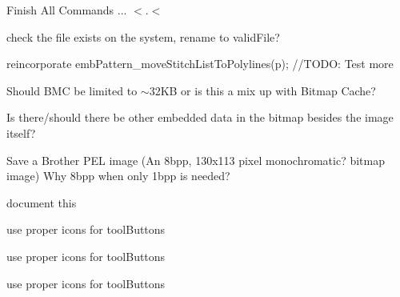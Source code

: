 \begin{DoxyRefList}
Finish All Commands ... \texorpdfstring{$<$}{<}.\texorpdfstring{$<$}{<} 
\item[Member \mbox{\hyperlink{class_main_window_af95b9b8dba27d822373f4424074bfde7}{Main\+Window\+::valid\+File\+Format}} (const QString \&file\+Name)]\label{todo__todo000004}%
%
check the file exists on the system, rename to valid\+File?  
\item[Member \mbox{\hyperlink{class_mdi_window_a8437f8fd71bcf6da5de2a49cbd0b105b}{Mdi\+Window\+::load\+File}} (const QString \&file\+Name)]\label{todo__todo000005}%
%
reincorporate emb\+Pattern\+\_\+move\+Stitch\+List\+To\+Polylines(p); //\+TODO\+: Test more  
\item[Member \mbox{\hyperlink{class_mdi_window_a2167cf71975c040208ae05b7b6b10a2f}{Mdi\+Window\+::save\+BMC}} ()]\label{todo__todo000007}%
%
Should BMC be limited to $\sim$32\+KB or is this a mix up with Bitmap Cache? 



Is there/should there be other embedded data in the bitmap besides the image itself? 

\label{todo__todo000006}%
%
Save a Brother PEL image (An 8bpp, 130x113 pixel monochromatic? bitmap image) Why 8bpp when only 1bpp is needed? 
\item[Member \mbox{\hyperlink{class_property_editor_af77a9b50a881ba48136c67f40c274e1e}{Property\+Editor\+::create\+Combo\+Box\+Selected}} ()]\label{todo__todo000018}%
%
document this  
\item[Member \mbox{\hyperlink{class_property_editor_a6e903f301e6b9cddd3e33f622c58d096}{Property\+Editor\+::create\+Group\+Box\+General}} ()]\label{todo__todo000020}%
%
use proper icons for tool\+Buttons  
\item[Member \mbox{\hyperlink{class_property_editor_a223e912eadfbb3aa8d44ed27e16e0486}{Property\+Editor\+::create\+Group\+Box\+Geometry\+Arc}} ()]\label{todo__todo000021}%
%
use proper icons for tool\+Buttons  
\item[Member \mbox{\hyperlink{class_property_editor_a93392f5daa30b8bd9c458df58075dd80}{Property\+Editor\+::create\+Group\+Box\+Geometry\+Block}} ()]\label{todo__todo000023}%
%
use proper icons for tool\+Buttons 




\end{DoxyRefList}
